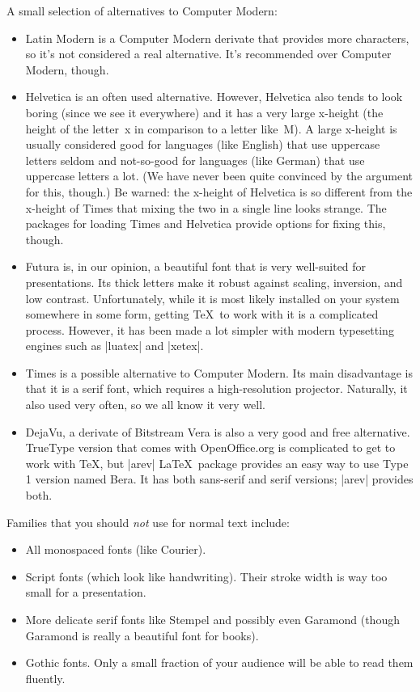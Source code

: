A small selection of alternatives to Computer Modern:
\begin{itemize}
\item
  Latin Modern is a Computer Modern derivate that provides more characters, so it's not considered a real alternative. It's recommended over Computer Modern, though.
\item
  Helvetica is an often used alternative. However, Helvetica also tends to look boring (since we see it everywhere) and it has a very large x-height (the height of the letter~x in comparison to a letter like~M). A large x-height is usually considered good for languages (like English) that use uppercase letters seldom and not-so-good for languages (like German) that use uppercase letters a lot. (We have never been quite convinced by the argument for this, though.) Be warned: the x-height of Helvetica is so different from the x-height of Times that mixing the two in a single line looks strange. The packages for loading Times and Helvetica provide options for fixing this, though.
\item
  Futura is, in our opinion, a beautiful font that is very well-suited for presentations. Its thick letters make it robust against scaling, inversion, and low contrast. Unfortunately, while it is most likely installed on your system somewhere in some form, getting \TeX\ to work with it is a complicated process. However, it has been made a lot simpler with modern typesetting engines such as |luatex| and |xetex|.
\item
  Times is a possible alternative to Computer Modern. Its main disadvantage is that it is a serif font, which requires a high-resolution projector. Naturally, it also used very often, so we all know it very well.
\item
  DejaVu, a derivate of Bitstream Vera is also a very good and free alternative. TrueType version that comes with OpenOffice.org is complicated to get to work with \TeX, but |arev| \LaTeX\ package provides an easy way to use Type 1 version named Bera. It has both sans-serif and serif versions; |arev| provides both.
\end{itemize}

Families that you should \emph{not} use for normal text include:
\begin{itemize}
\item
  All monospaced fonts (like Courier).
\item
  Script fonts (which look like handwriting). Their stroke width is way too small for a presentation.
\item
  More delicate serif fonts like Stempel and possibly even Garamond (though Garamond is really a beautiful font for books).
\item
  Gothic fonts. Only a small fraction of your audience will be able to read them fluently.
\end{itemize}

